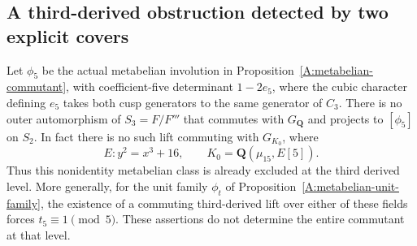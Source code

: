 \subsection{A third-derived obstruction detected by two explicit covers}

\begin{proposition}
\label{A:third-derived-obstruction}
Let $\phi_5$ be the actual metabelian involution in
Proposition~\ref{A:metabelian-commutant}, with coefficient-five
determinant $1-2e_5$, where the cubic character defining $e_5$
takes both cusp generators to the same generator of $C_3$.
There is no outer automorphism of $S_3=F/F'''$ that commutes
with $G_{\mathbf Q}$ and projects to $[\phi_5]$ on $S_2$.
In fact there is no such lift commuting with
$G_{K_0}$, where
\[
 E:y^2=x^3+16,\qquad
 K_0=\mathbf Q(\mu_{15},E[5]).
\]
Thus this nonidentity metabelian class is already excluded
at the third derived level. More generally, for the unit
family $\phi_t$ of Proposition~\ref{A:metabelian-unit-family},
the existence of a commuting third-derived lift over either
of these fields forces $t_5\equiv1\pmod5$.
These assertions do not determine the entire commutant
at that level.
\end{proposition}
